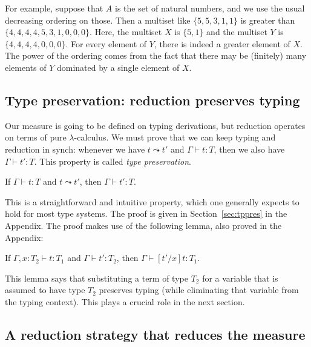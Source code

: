 \documentclass{article}
\begin{document}
For example, suppose that $A$ is the set of natural numbers, and we use the usual decreasing ordering on those.  Then
a multiset like $\{ 5, 5, 3 , 1 , 1 \}$ is greater than $\{ 4 , 4 , 4 , 4 , 5 , 3 , 1 , 0 , 0 , 0 \}$.  Here, the
multiset $X$ is $\{ 5, 1 \}$ and the multiset $Y$ is $\{ 4 , 4 , 4 , 4 , 0 , 0 , 0 \}$.  For every element of $Y$,
there is indeed a greater element of $X$.  The power of the ordering comes from the fact that there may be (finitely) many
elements of $Y$ dominated by a single element of $X$.  

\subsection{Type preservation: reduction preserves typing}

Our measure is going to be defined on typing derivations, but reduction
operates on terms of pure $\lambda$-calculus.  We must prove that we can
keep typing and reduction in synch: whenever we have $t \leadsto t'$ and
$\Gamma \vdash t : T$, then we also have $\Gamma \vdash t' : T$.  This
property is called \emph{type preservation}.

\vspace{.25cm}
\begin{theorem}
\label{thm:tppres}
If $\Gamma\vdash t : T$ and $t \leadsto t'$, then $\Gamma\vdash t' : T$.
\end{theorem}

This is a straightforward and intuitive property, which one generally
expects to hold for most type systems.  The proof is given in Section~\ref{sec:tppres}
in the Appendix.  The proof makes use of the following lemma, also proved in the Appendix:

\vspace{.25cm}
\begin{lemma}[Substitution]
\label{lem:stlcsubst}
If $\Gamma, x:T_2 \vdash t : T_1$ and $\Gamma \vdash t' : T_2$, then
$\Gamma \vdash [t'/x]t : T_1$.
\end{lemma}

\noindent This lemma says that substituting a term of type $T_2$ for a variable that
is assumed to have type $T_2$ preserves typing (while eliminating that
variable from the typing context).  This plays a crucial role in the next section.
  
\subsection{A reduction strategy that reduces the measure}
\label{sec:mudec}
\end{document}
